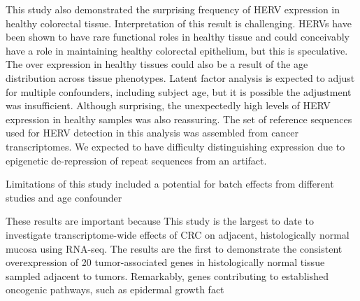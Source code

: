This study also demonstrated the surprising frequency of HERV expression in healthy colorectal tissue.
Interpretation of this result is challenging.
HERVs have been shown to have rare functional roles in healthy tissue \citep{Rote2004} and could conceivably have a role in maintaining healthy colorectal epithelium, but this is speculative.
The over expression in healthy tissues could also be a result of the age distribution across tissue phenotypes.
Latent factor analysis is expected to adjust for multiple confounders, including subject age, but it is possible the adjustment was insufficient.
Although surprising, the unexpectedly high levels of HERV expression in healthy samples was also reassuring.
The set of reference sequences used for HERV detection in this analysis was assembled from cancer transcriptomes.
We expected to have difficulty distinguishing expression due to epigenetic de-repression of repeat sequences from an artifact.

Limitations of this study included a potential for batch effects from different studies and age confounder

These results are important because
This study is the largest to date to investigate transcriptome-wide effects of CRC on adjacent, histologically normal mucosa using RNA-seq.
The results are the first to demonstrate the consistent overexpression of 20 tumor-associated genes in histologically normal tissue sampled adjacent to tumors.
Remarkably, genes contributing to established oncogenic pathways, such as epidermal growth fact
